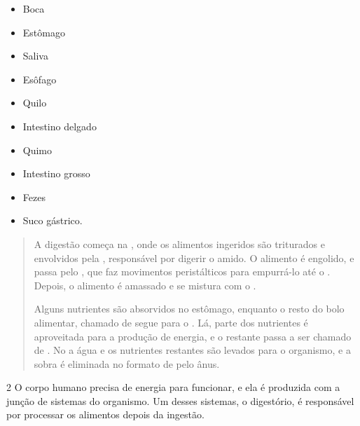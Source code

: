 \begin{itemize}
\item Boca

\item Estômago

\item Saliva

\item Esôfago

\item Quilo

\item Intestino delgado

\item Quimo

\item Intestino grosso

\item Fezes

\item Suco gástrico.
\end{itemize}

\begin{quote}
A digestão começa na \preencher{}, onde os alimentos ingeridos são
triturados e envolvidos pela \preencher{}, responsável por digerir
o amido. O alimento é engolido, e passa pelo \preencher{}, que faz
movimentos peristálticos para empurrá-lo até o \preencher{}.
Depois, o alimento é amassado e se mistura com o \preencher{}.

Alguns nutrientes são absorvidos no estômago, enquanto o resto do bolo
alimentar, chamado de \preencher{} segue para o \preencher{}. Lá, parte dos nutrientes é aproveitada para a produção de
energia, e o restante passa a ser chamado de \preencher{}. No \preencher{} a água e os nutrientes restantes são levados para o
organismo, e a sobra é eliminada no formato de \preencher{} pelo
ânus.
\end{quote}


\num{2} O corpo humano precisa de energia para funcionar, e ela é
produzida com a junção de sistemas do organismo. Um desses sistemas, o
digestório, é responsável por processar os alimentos depois da ingestão.

